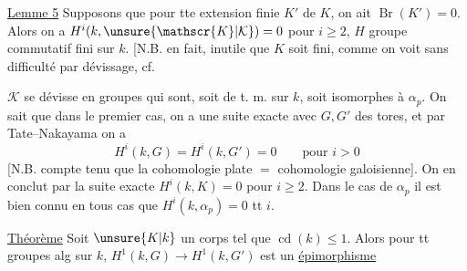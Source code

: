 \uline{Lemme 5} Supposons que pour tte  extension finie  $K'$ de $K$, on ait $\operatorname{Br}(K')=0$. Alors on a $H^i(k,\unsure{\mathscr{K}|\mathcal{K}})=0$ pour $i\geq2$, $H$ groupe commutatif fini sur $k$. [N.B. en fait, inutile que $K$ soit fini, comme on voit sans difficulté par dévissage, cf. 

$\mathscr{K}$ se dévisse en groupes qui sont, soit de t. m. sur $k$,  soit isomorphes à $\alpha_p$. On sait que dans le premier cas, on a une suite exacte
avec $G,G'$ des tores, et par Tate--Nakayama on a
\[
H^i(k,G)=H^i(k,G')=0\qquad\text{pour }i>0
\]
[N.B. compte tenu que la cohomologie plate $=$ cohomologie galoisienne]. On en conclut par la suite exacte $H^i(k,K)=0$ pour $i\geq2$. Dans le cas de $\alpha_p$ il est bien connu en tous cas que $H^i(k,\alpha_p)=0$ tt $i$.

\uline{Théorème} Soit $\unsure{K|k}$ un corps tel que $\operatorname{cd}(k)\leq1$. Alors pour tt   groupes alg sur $k$, $H^1(k,G)\longrightarrow H^1(k,G')$ est un \uline{épimorphisme}

